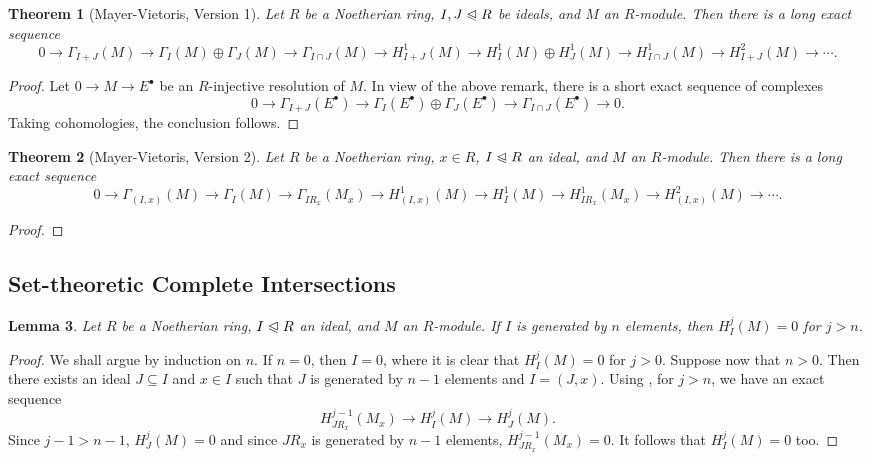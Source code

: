 \documentclass[10pt]{article}
\theoremstyle{thmstyle}
\newtheorem{theorem}{Theorem}[section]
\newtheorem{lemma}[theorem]{Lemma}
\theoremstyle{defstyle}
\newcommand{\noreq}{\trianglelefteqslant}
\begin{document}
\begin{theorem}[Mayer-Vietoris, Version 1]
	Let $R$ be a Noetherian ring, $I, J\noreq R$ be ideals, and $M$ an $R$-module. Then there is a long exact sequence 
	\begin{equation*}
		0\to\Gamma_{I + J}(M)\to\Gamma_I(M)\oplus\Gamma_J(M)\to\Gamma_{I\cap J}(M)\to H^1_{I + J}(M)\to H^1_I(M)\oplus H^1_J(M)\to H^1_{I\cap J}(M)\to H^2_{I + J}(M)\to\cdots.
	\end{equation*}
\end{theorem}
\begin{proof}
	Let $0\to M\to E^\bullet$ be an $R$-injective resolution of $M$. In view of the above remark, there is a short exact sequence of complexes 
	\begin{equation*}
		0\to\Gamma_{I + J}\left(E^\bullet\right)\to\Gamma_I\left(E^\bullet\right)\oplus\Gamma_J\left(E^\bullet\right)\to\Gamma_{I\cap J}\left(E^\bullet\right)\to 0.
	\end{equation*}
	Taking cohomologies, the conclusion follows.
\end{proof}

\begin{theorem}[Mayer-Vietoris, Version 2]
	Let $R$ be a Noetherian ring, $x\in R$, $I\noreq R$ an ideal, and $M$ an $R$-module. Then there is a long exact sequence 
	\begin{equation*}
		0\to\Gamma_{(I, x)}(M)\to\Gamma_I(M)\to\Gamma_{IR_x}(M_x)\to H^1_{(I, x)}(M)\to H^1_I(M)\to H^1_{IR_x}(M_x)\to H^2_{(I, x)}(M)\to\cdots.
	\end{equation*}
\end{theorem}
\begin{proof}
\end{proof}

\subsection{Set-theoretic Complete Intersections}

\begin{lemma}
	Let $R$ be a Noetherian ring, $I\noreq R$ an ideal, and $M$ an $R$-module. If $I$ is generated by $n$ elements, then $H^j_I(M) = 0$ for $j > n$.
\end{lemma}
\begin{proof}
	We shall argue by induction on $n$. If $n = 0$, then $I = 0$, where it is clear that $H^j_I(M) = 0$ for $j > 0$. Suppose now that $n > 0$. Then there exists an ideal $J\subseteq I$ and $x\in I$ such that $J$ is generated by $n - 1$ elements and $I = (J, x)$. Using , for $j > n$, we have an exact sequence
	\begin{equation*}
		H^{j - 1}_{JR_x}(M_x)\to H^j_I(M)\to H^j_J(M).
	\end{equation*}
	Since $j - 1 > n - 1$, $H^j_J(M) = 0$ and since $JR_x$ is generated by $n - 1$ elements, $H^{j - 1}_{JR_x}(M_x) = 0$. It follows that $H^j_I(M) = 0$ too.
\end{proof}
\end{document}
